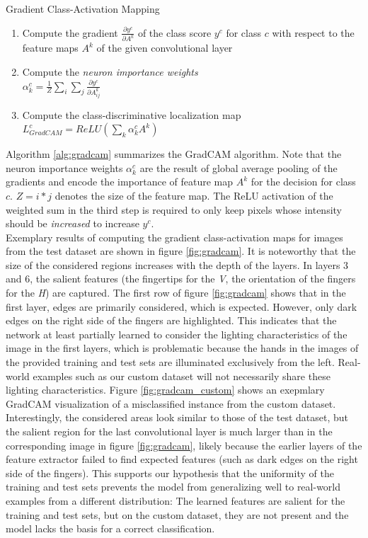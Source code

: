 \documentclass[a4paper]{article}
\begin{document}
\begin{algorithm}
     \caption{Gradient Class-Activation Mapping}
     \label{alg:gradcam}
     \begin{enumerate}
          \item Compute the gradient $\frac{\partial y^c}{\partial A^k}$ of the class score $y^c$ for class $c$ with respect to the feature maps $A^k$ of the given convolutional layer
          \item Compute the \textit{neuron importance weights}\\ $\alpha^c_k = \frac{1}{Z} \sum_i \sum_j \frac{\partial y^c}{\partial A^k_{ij}}$
          \item Compute the class-discriminative localization map\\
          $L^c_{GradCAM} = ReLU(\sum_k \alpha_k^c A^k)$
     \end{enumerate}
\end{algorithm}
Algorithm \ref{alg:gradcam} summarizes the GradCAM algorithm. Note that the neuron importance weights $\alpha_k^c$ are the result of global average pooling of the gradients and encode the importance of feature map $A^k$ for the decision for class $c$. $Z = i*j$ denotes the size of the feature map. The ReLU activation of the weighted sum in the third step is required to only keep pixels whose intensity should be \textit{increased} to increase $y^c$.\\
Exemplary results of computing the gradient class-activation maps for images from the test dataset are shown in figure \ref{fig:gradcam}. It is noteworthy that the size of the considered regions increases with the depth of the layers. In layers 3 and 6, the salient features (the fingertips for the \textit{V}, the orientation of the fingers for the \textit{H}) are captured. The first row of figure \ref{fig:gradcam} shows that in the first layer, edges are primarily considered, which is expected. However, only dark edges on the right side of the fingers are highlighted. This indicates that the network at least partially learned to consider the lighting characteristics of the image in the first layers, which is problematic because the hands in the images of the provided training and test sets are illuminated exclusively from the left. Real-world examples such as our custom dataset will not necessarily share these lighting characteristics. Figure \ref{fig:gradcam_custom} shows an exepmlary GradCAM visualization of a misclassified instance from the custom dataset. Interestingly, the considered areas look similar to those of the test dataset, but the salient region for the last convolutional layer is much larger than in the corresponding image in figure \ref{fig:gradcam}, likely because the earlier layers of the feature extractor failed to find expected features (such as dark edges on the right side of the fingers). This supports our hypothesis that the uniformity of the training and test sets prevents the model from generalizing well to real-world examples from a different distribution: The learned features are salient for the training and test sets, but on the custom dataset, they are not present and the model lacks the basis for a correct classification.
\end{document}
